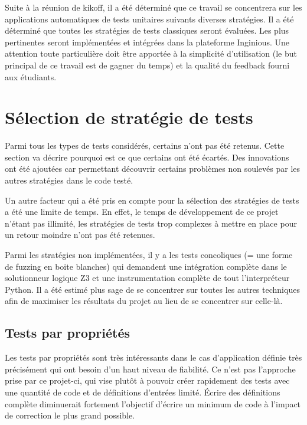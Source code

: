 \documentclass[a4paper]{report}
\begin{document}
Suite à la réunion de kikoff, il a été déterminé que ce travail se concentrera sur les applications automatiques de tests unitaires suivants diverses stratégies.
Il a été déterminé que toutes les stratégies de tests classiques seront évaluées.
Les plus pertinentes seront implémentées et intégrées dans la plateforme Inginious.
Une attention toute particulière doit être apportée à la simplicité d’utilisation (le but principal de ce travail est de gagner du temps) et la qualité du feedback fourni aux étudiants.
 
 
\section{Sélection de stratégie de tests}

Parmi tous les types de tests considérés, certains n'ont pas été retenus.
Cette section va décrire pourquoi est ce que certains ont été écartés.
Des innovations ont été ajoutées car permettant découvrir certains problèmes non soulevés par les autres stratégies dans le code testé.

Un autre facteur qui  a été pris en compte pour la sélection des stratégies de tests a été  une limite de temps.
En effet, le temps de développement de ce projet n'étant pas illimité, les stratégies de tests trop complexes à mettre en place pour un retour moindre n'ont pas été retenues.

Parmi les stratégies non implémentées, il y a les tests concoliques (= une forme de fuzzing en boite blanches) qui demandent une intégration complète dans le solutionneur logique Z3 et une instrumentation complète de tout l'interpréteur Python.
Il a été estimé plus sage de se concentrer sur toutes les autres techniques afin de maximiser les résultats du projet au lieu de se concentrer sur celle-là.


\subsection{Tests par propriétés}

Les tests par propriétés sont très intéressants dans le cas d'application définie très précisément qui ont besoin d'un haut niveau de fiabilité.
Ce n'est pas l'approche prise par ce projet-ci, qui vise plutôt à pouvoir créer rapidement des tests avec une quantité de code et de définitions d'entrées limité.
Écrire des définitions complète diminuerait fortement l'objectif d'écrire un minimum de code à l'impact de correction le plus grand possible.
\end{document}
